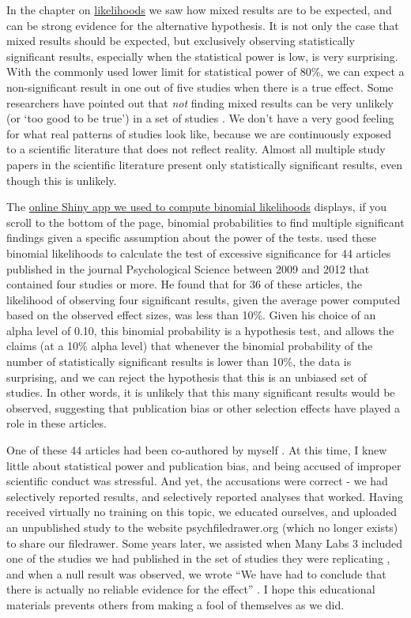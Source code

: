 \documentclass[
  oneside]{krantz}
\begin{document}
In the chapter on \protect\hyperlink{likelihoods}{likelihoods} we saw how mixed results are to be expected, and can be strong evidence for the alternative hypothesis. It is not only the case that mixed results should be expected, but exclusively observing statistically significant results, especially when the statistical power is low, is very surprising. With the commonly used lower limit for statistical power of 80\%, we can expect a non-significant result in one out of five studies when there is a true effect. Some researchers have pointed out that \emph{not} finding mixed results can be very unlikely (or `too good to be true') in a set of studies \citep{francis_frequency_2014, schimmack_ironic_2012}. We don't have a very good feeling for what real patterns of studies look like, because we are continuously exposed to a scientific literature that does not reflect reality. Almost all multiple study papers in the scientific literature present only statistically significant results, even though this is unlikely.

The \href{http://shiny.ieis.tue.nl/mixed_results_likelihood/}{online Shiny app we used to compute binomial likelihoods} displays, if you scroll to the bottom of the page, binomial probabilities to find multiple significant findings given a specific assumption about the power of the tests. \citet{francis_frequency_2014} used these binomial likelihoods to calculate the test of excessive significance \citep{ioannidis_exploratory_2007} for 44 articles published in the journal Psychological Science between 2009 and 2012 that contained four studies or more. He found that for 36 of these articles, the likelihood of observing four significant results, given the average power computed based on the observed effect sizes, was less than 10\%. Given his choice of an alpha level of 0.10, this binomial probability is a hypothesis test, and allows the claims (at a 10\% alpha level) that whenever the binomial probability of the number of statistically significant results is lower than 10\%, the data is surprising, and we can reject the hypothesis that this is an unbiased set of studies. In other words, it is unlikely that this many significant results would be observed, suggesting that publication bias or other selection effects have played a role in these articles.

One of these 44 articles had been co-authored by myself \citep{jostmann_weight_2009}. At this time, I knew little about statistical power and publication bias, and being accused of improper scientific conduct was stressful. And yet, the accusations were correct - we had selectively reported results, and selectively reported analyses that worked. Having received virtually no training on this topic, we educated ourselves, and uploaded an unpublished study to the website psychfiledrawer.org (which no longer exists) to share our filedrawer. Some years later, we assisted when Many Labs 3 included one of the studies we had published in the set of studies they were replicating \citep{ebersole_many_2016}, and when a null result was observed, we wrote ``We have had to conclude that there is actually no reliable evidence for the effect'' \citep{jostmann_short_2016}. I hope this educational materials prevents others from making a fool of themselves as we did.
\end{document}
